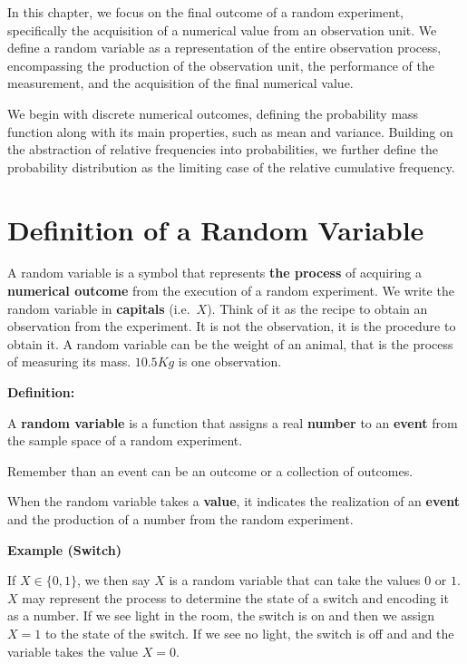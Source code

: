 \documentclass[
]{book}
\begin{document}
In this chapter, we focus on the final outcome of a random experiment, specifically the acquisition of a numerical value from an observation unit. We define a random variable as a representation of the entire observation process, encompassing the production of the observation unit, the performance of the measurement, and the acquisition of the final numerical value.

We begin with discrete numerical outcomes, defining the probability mass function along with its main properties, such as mean and variance. Building on the abstraction of relative frequencies into probabilities, we further define the probability distribution as the limiting case of the relative cumulative frequency.

\hypertarget{definition-of-a-random-variable}{%
\section{Definition of a Random Variable}\label{definition-of-a-random-variable}}

A random variable is a symbol that represents \textbf{the process} of acquiring a \textbf{numerical outcome} from the execution of a random experiment. We write the random variable in \textbf{capitals} (i.e.~\(X\)). Think of it as the recipe to obtain an observation from the experiment. It is not the observation, it is the procedure to obtain it. A random variable can be the weight of an animal, that is the process of measuring its mass. \(10.5Kg\) is one observation.

\textbf{Definition:}

A \textbf{random variable} is a function that assigns a real \textbf{number} to an \textbf{event} from the sample space of a random experiment.

Remember than an event can be an outcome or a collection of outcomes.

When the random variable takes a \textbf{value}, it indicates the realization of an \textbf{event} and the production of a number from the random experiment.

\textbf{Example (Switch)}

If \(X \in \{0,1\}\), we then say \(X\) is a random variable that can take the values \(0\) or \(1\). \(X\) may represent the process to determine the state of a switch and encoding it as a number. If we see light in the room, the switch is on and then we assign \(X=1\) to the state of the switch. If we see no light, the switch is off and and the variable takes the value \(X=0\).
\end{document}
